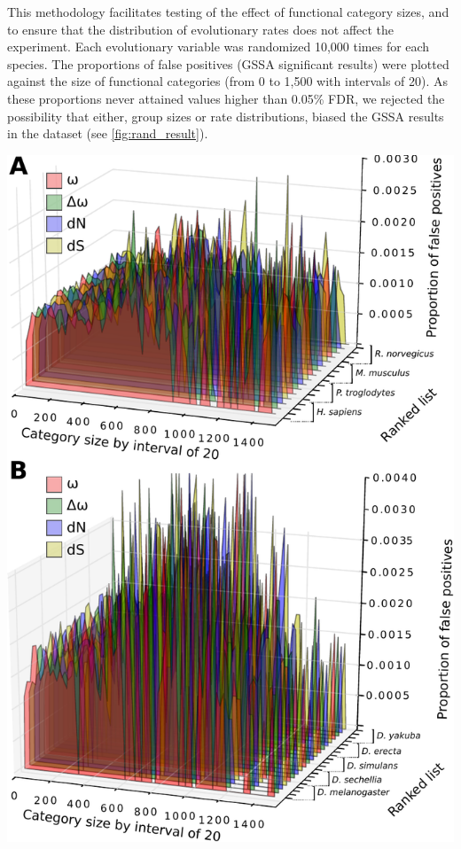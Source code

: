 This methodology facilitates testing of the effect of functional category sizes, and to ensure that the distribution of evolutionary rates does not affect the experiment. Each evolutionary variable was randomized 10,000 times for each species. The proportions of false positives (GSSA significant results) were plotted against the size of functional categories (from 0 to 1,500 with intervals of 20). As these proportions never attained values higher than 0.05\% FDR, we rejected the possibility that either, group sizes or rate distributions, biased the GSSA results in the dataset (see \autoref{fig:rand_result}).

\begin{PPfigure}
  \centering 
  \includegraphics[height=0.9\textheight]{figures/material_methods/simulations.pdf}

\end{PPfigure}
